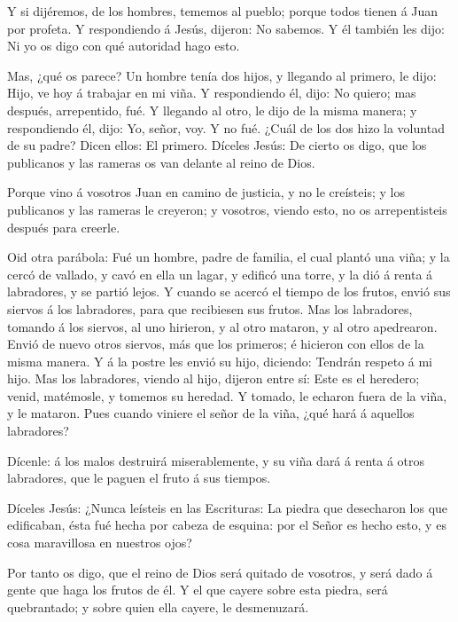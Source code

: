  Y si dijéremos, de los hombres, tememos al pueblo; porque
todos tienen á Juan por profeta.  Y respondiendo á Jesús,
dijeron: No sabemos. Y él también les dijo: Ni yo os digo con qué
autoridad hago esto.

 Mas, ¿qué os parece? Un hombre tenía dos hijos, y llegando
al primero, le dijo: Hijo, ve hoy á trabajar en mi viña.  Y
respondiendo él, dijo: No quiero; mas después, arrepentido, fué.
 Y llegando al otro, le dijo de la misma manera; y
respondiendo él, dijo: Yo, señor, voy. Y no fué.  ¿Cuál de
los dos hizo la voluntad de su padre? Dicen ellos: El primero. Díceles
Jesús: De cierto os digo, que los publicanos y las rameras os van
delante al reino de Dios.

 Porque vino á vosotros Juan en camino de justicia, y no le
creísteis; y los publicanos y las rameras le creyeron; y vosotros,
viendo esto, no os arrepentisteis después para creerle.

 Oid otra parábola: Fué un hombre, padre de familia, el
cual plantó una viña; y la cercó de vallado, y cavó en ella un lagar, y
edificó una torre, y la dió á renta á labradores, y se partió lejos.
 Y cuando se acercó el tiempo de los frutos, envió sus
siervos á los labradores, para que recibiesen sus frutos. 
Mas los labradores, tomando á los siervos, al uno hirieron, y al otro
mataron, y al otro apedrearon.  Envió de nuevo otros
siervos, más que los primeros; é hicieron con ellos de la misma manera.
 Y á la postre les envió su hijo, diciendo: Tendrán respeto
á mi hijo.  Mas los labradores, viendo al hijo, dijeron
entre sí: Este es el heredero; venid, matémosle, y tomemos su heredad.
 Y tomado, le echaron fuera de la viña, y le mataron.
 Pues cuando viniere el señor de la viña, ¿qué hará á
aquellos labradores?

 Dícenle: á los malos destruirá miserablemente, y su viña
dará á renta á otros labradores, que le paguen el fruto á sus tiempos.

 Díceles Jesús: ¿Nunca leísteis en las Escrituras: La
piedra que desecharon los que edificaban, ésta fué hecha por cabeza de
esquina: por el Señor es hecho esto, y es cosa maravillosa en nuestros
ojos?

 Por tanto os digo, que el reino de Dios será quitado de
vosotros, y será dado á gente que haga los frutos de él.  Y
el que cayere sobre esta piedra, será quebrantado; y sobre quien ella
cayere, le desmenuzará.

